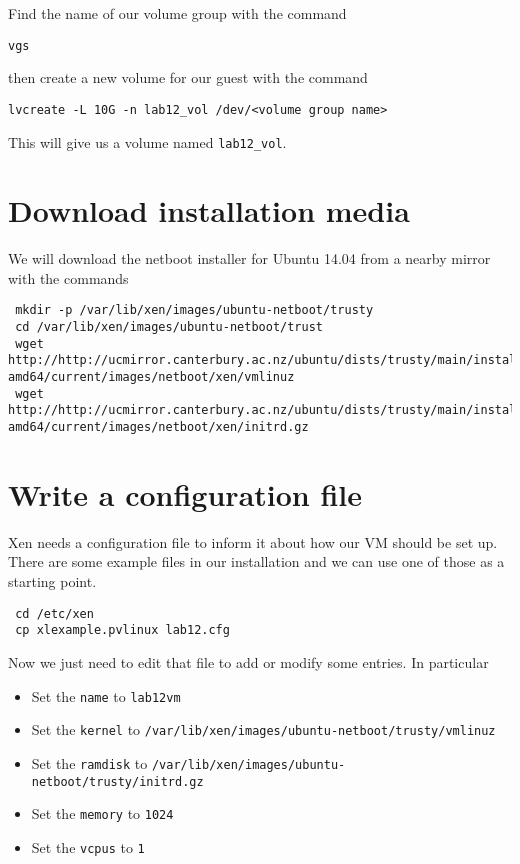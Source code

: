 \documentclass{article}
\begin{document}
 Find the name of our volume group with the command
 
 \texttt{vgs}
 
 then create a new volume for our guest with the command 
 
 \texttt{lvcreate -L 10G -n lab12\_vol /dev/<volume group name>}
 
 This will give us a volume named \texttt{lab12\_vol}.

 \section{Download installation media}
 We will download the netboot installer for Ubuntu 14.04 from a nearby mirror with the commands
 
 \begin{verbatim}
 mkdir -p /var/lib/xen/images/ubuntu-netboot/trusty
 cd /var/lib/xen/images/ubuntu-netboot/trust
 wget http://http://ucmirror.canterbury.ac.nz/ubuntu/dists/trusty/main/installer-amd64/current/images/netboot/xen/vmlinuz
 wget http://http://ucmirror.canterbury.ac.nz/ubuntu/dists/trusty/main/installer-amd64/current/images/netboot/xen/initrd.gz
 \end{verbatim}
 
 \section{Write a configuration file}
 Xen needs a configuration file to inform it about how our VM should be set up. There are some example files in our installation
 and we can use one of those as a starting point.
 
 \begin{verbatim}
 cd /etc/xen
 cp xlexample.pvlinux lab12.cfg
 \end{verbatim}
 
 Now we just need to edit that file to add or modify some entries. In particular
 
 \begin{itemize}
  \item Set the \texttt{name} to \texttt{lab12vm}
  \item Set the \texttt{kernel} to \texttt{/var/lib/xen/images/ubuntu-netboot/trusty/vmlinuz}
  \item Set the \texttt{ramdisk} to \texttt{/var/lib/xen/images/ubuntu-netboot/trusty/initrd.gz}
  \item Set the \texttt{memory} to \texttt{1024}
   \item Set the \texttt{vcpus} to \texttt{1}
 \end{itemize}
 
\end{document}

